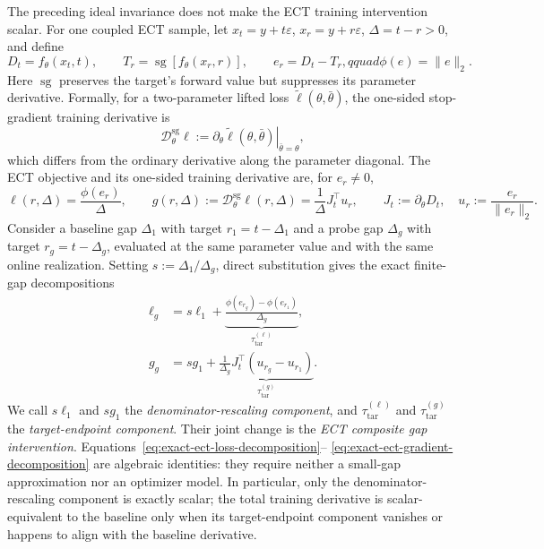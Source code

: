 The preceding ideal invariance does not make the ECT training intervention
scalar. For one coupled ECT sample, let
$x_t=y+t\varepsilon$, $x_r=y+r\varepsilon$, $\Delta=t-r>0$, and define
\begin{equation}
  D_t=f_\theta(x_t,t),\qquad
  T_r=\operatorname{sg}\!\left[f_\theta(x_r,r)\right],\qquad
  e_r=D_t-T_r,qquad
  \phi(e)=\lVert e\rVert_2 .
  \label{eq:ect-residual}
\end{equation}
Here $\operatorname{sg}$ preserves the target's forward value but suppresses its
parameter derivative. Formally, for a two-parameter lifted loss
$\widetilde\ell(\theta,\bar\theta)$, the one-sided stop-gradient training
derivative is
\begin{equation}
  \mathcal{D}^{\mathrm{sg}}_\theta\ell
  :=\left.
  \partial_\theta\widetilde\ell(\theta,\bar\theta)
  \right|_{\bar\theta=\theta},
  \label{eq:sg-training-derivative}
\end{equation}
which differs from the ordinary derivative along the parameter diagonal. The
ECT objective and its one-sided training derivative are, for $e_r\neq0$,
\begin{equation}
  \ell(r,\Delta)=\frac{\phi(e_r)}{\Delta},
  \qquad
  g(r,\Delta):=\mathcal{D}^{\mathrm{sg}}_\theta\ell(r,\Delta)
  =\frac{1}{\Delta}J_t^\top u_r,
  \qquad
  J_t:=\partial_\theta D_t,
  \quad
  u_r:=\frac{e_r}{\lVert e_r\rVert_2}.
  \label{eq:exact-ect-gradient}
\end{equation}
Consider a baseline gap $\Delta_1$ with target
$r_1=t-\Delta_1$ and a probe gap $\Delta_g$ with target
$r_g=t-\Delta_g$, evaluated at the same parameter value and with the same
online realization. Setting $s:=\Delta_1/\Delta_g$, direct substitution gives
the exact finite-gap decompositions
\begin{align}
  \ell_g
  &=s\ell_1
    +\underbrace{\frac{\phi(e_{r_g})-\phi(e_{r_1})}{\Delta_g}}
      _{\tau^{(\ell)}_{\mathrm{tar}}},
  \label{eq:exact-ect-loss-decomposition}\\
  g_g
  &=s g_1
    +\underbrace{\frac{1}{\Delta_g}J_t^\top
      \left(u_{r_g}-u_{r_1}\right)}
      _{\tau^{(g)}_{\mathrm{tar}}}.
  \label{eq:exact-ect-gradient-decomposition}
\end{align}
We call $s\ell_1$ and $s g_1$ the \emph{denominator-rescaling component}, and
$\tau^{(\ell)}_{\mathrm{tar}}$ and $\tau^{(g)}_{\mathrm{tar}}$ the
\emph{target-endpoint component}. Their joint change is the \emph{ECT composite
gap intervention}. Equations~\eqref{eq:exact-ect-loss-decomposition}--
\eqref{eq:exact-ect-gradient-decomposition} are algebraic identities: they
require neither a small-gap approximation nor an optimizer model. In
particular, only the denominator-rescaling component is exactly scalar; the
total training derivative is scalar-equivalent to the baseline only when its
target-endpoint component vanishes or happens to align with the baseline
derivative.

